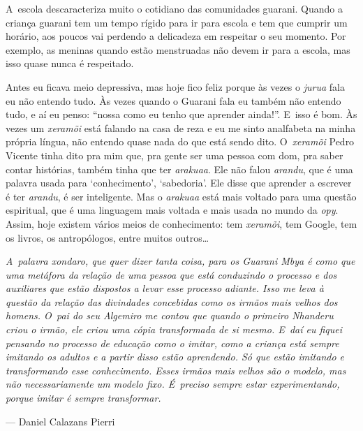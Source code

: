 A~escola descaracteriza muito o cotidiano das comunidades guarani.
Quando a criança guarani tem um tempo rígido para ir para escola e tem
que cumprir um horário, aos poucos vai perdendo a delicadeza em
respeitar o seu momento. Por exemplo, as meninas quando estão
menstruadas não devem ir para a escola, mas isso quase nunca é
respeitado.

Antes eu ficava meio depressiva, mas hoje fico feliz porque às vezes o
\emph{jurua} fala eu não entendo tudo. Às vezes quando o Guarani fala eu
também não entendo tudo, e aí eu penso: ``nossa como eu tenho que
aprender ainda!''. E~isso é bom. Às vezes um \emph{xeramõi} está falando na
casa de reza e eu me sinto analfabeta na minha própria língua, não
entendo quase nada do que está sendo dito. O~\emph{xeramõi} Pedro Vicente
tinha dito pra mim que, pra gente ser uma pessoa com dom, pra saber
contar histórias, também tinha que ter \emph{arakuaa}. Ele não falou \emph{arandu},
que é uma palavra usada para ‘conhecimento’, ‘sabedoria’. Ele disse que
aprender a escrever é ter \emph{arandu}, é ser inteligente. Mas o \emph{arakuaa} está
mais voltado para uma questão espiritual, que é uma linguagem mais
voltada e mais usada no mundo da \emph{opy}. Assim, hoje existem vários meios
de conhecimento: tem \emph{xeramõi}, tem Google, tem os livros, os
antropólogos, entre muitos outros\ldots{}

\clearpage

\vspace*{\fill}

\begin{flushright}
\begin{minipage}[c]{0.85\textwidth}
\raggedleft
\footnotesize
\emph{A~palavra \emph{xondaro}, que quer dizer tanta coisa, para os Guarani Mbya é
como que uma metáfora da relação de uma pessoa que está conduzindo o
processo e dos auxiliares que estão dispostos a levar esse processo
adiante. Isso me leva à questão da relação das divindades concebidas
como os irmãos mais velhos dos homens. O~pai do seu Algemiro me contou
que quando o primeiro \emph{Nhanderu} criou o irmão, ele criou uma cópia
transformada de si mesmo. E~daí eu fiquei pensando no processo de
educação como o imitar, como a criança está sempre imitando os adultos
e a partir disso estão aprendendo. Só que estão imitando e
transformando esse conhecimento. Esses irmãos mais velhos são o modelo,
mas não necessariamente um modelo fixo. É~preciso sempre estar
experimentando, porque imitar é sempre transformar.}

\smallskip
\hspace*{\fill}--- Daniel Calazans Pierri
\end{minipage}
\end{flushright}

